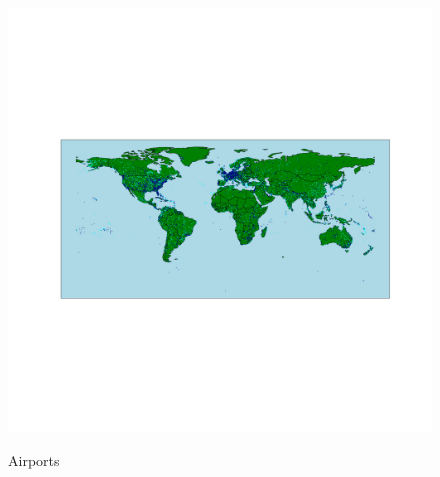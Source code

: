 \begin{figure}[H]
  \centering
  \caption{Airports}
    \includegraphics[width=1. \textwidth]{Exam/Airports_WorldMap}
  \label{fig:airports}
\end{figure}

